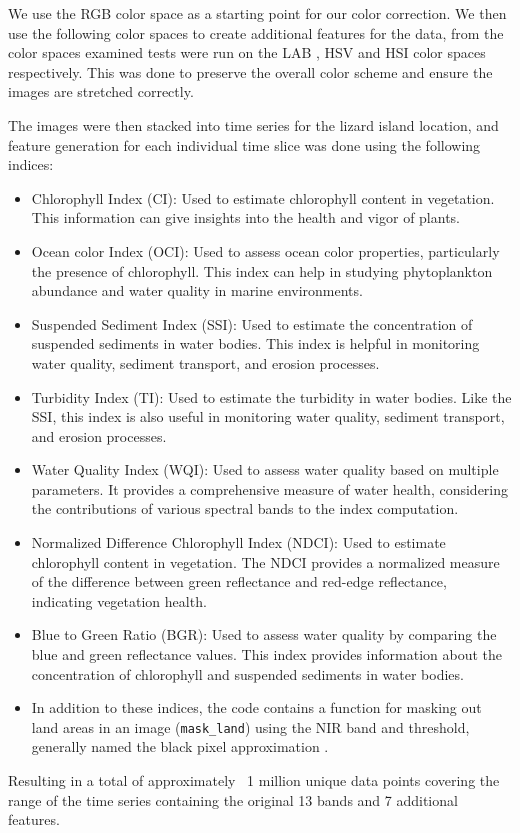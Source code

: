 \documentclass[journal,article,submit,pdftex,moreauthors]{Definitions/mdpi}
\begin{document}
We use the RGB color space as a starting point for our color correction. We then use the following color spaces to create additional features for the data, from the color spaces examined tests were run on the LAB \cite{wyszecki2000color}, HSV and HSI \cite{gonzalezr2006digital} 
color spaces respectively. This was done to preserve the overall color scheme and ensure the images are stretched correctly.  

The images were then stacked into time series for the lizard island location, and feature generation for each individual time slice was done using the following indices:
 \begin{itemize}
	\item Chlorophyll Index (CI): Used to estimate chlorophyll content in vegetation. This information can give insights into the health and vigor of plants.
	
	\item Ocean color Index (OCI): Used to assess ocean color properties, particularly the presence of chlorophyll. This index can help in studying phytoplankton abundance and water quality in marine environments.
	
	\item Suspended Sediment Index (SSI): Used to estimate the concentration of suspended sediments in water bodies. This index is helpful in monitoring water quality, sediment transport, and erosion processes.
	
	\item Turbidity Index (TI): Used to estimate the turbidity in water bodies. Like the SSI, this index is also useful in monitoring water quality, sediment transport, and erosion processes.
	
	\item Water Quality Index (WQI): Used to assess water quality based on multiple parameters. It provides a comprehensive measure of water health, considering the contributions of various spectral bands to the index computation.
	
	\item Normalized Difference Chlorophyll Index (NDCI): Used to estimate chlorophyll content in vegetation. The NDCI provides a normalized measure of the difference between green reflectance and red-edge reflectance, indicating vegetation health.
	
	\item Blue to Green Ratio (BGR): Used to assess water quality by comparing the blue and green reflectance values. This index provides information about the concentration of chlorophyll and suspended sediments in water bodies.
	
	\item In addition to these indices, the code contains a function for masking out land areas in an image (\texttt{mask\_land}) using the NIR band and threshold, generally named the black pixel approximation \cite{siegel2000atmospheric}.
\end{itemize}
Resulting in a total of approximately ~1 million unique data points covering the range of the time series containing the original 13 bands and 7 additional features.
\end{document}
